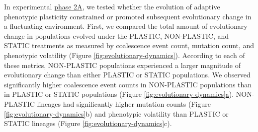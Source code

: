 % 
% 
% 
% 

In experimental \hyperref[sec:methods:exp:evolutionary-change-rate]{phase 2A},
we tested whether the evolution of adaptive phenotypic plasticity constrained or promoted subsequent evolutionary change in a fluctuating environment. 
First, we compared the total amount of evolutionary change in populations evolved under the PLASTIC, NON-PLASTIC, and STATIC treatments as measured by  coalescence event count, mutation count, and phenotypic volatility (Figure \ref{fig:evolutionary-dynamics}).
According to each of these metrics, NON-PLASTIC populations experienced a larger magnitude of evolutionary change than either PLASTIC or STATIC populations.
We observed significantly higher coalescence event counts in NON-PLASTIC populations than in PLASTIC or STATIC populations (Figure \ref{fig:evolutionary-dynamics}\hyperref[fig:evolutionary-dynamics]{a}).
NON-PLASTIC lineages had significantly higher mutation counts (Figure \ref{fig:evolutionary-dynamics}b) and phenotypic volatility than PLASTIC or STATIC lineages (Figure \ref{fig:evolutionary-dynamics}c).

